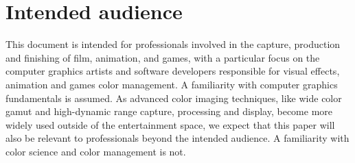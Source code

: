 \section{Intended audience}

This document is intended for professionals involved in the capture, production and finishing of film, animation, and games, with a particular focus on the computer graphics artists and software developers responsible for visual effects, animation and games color management. A familiarity with computer graphics fundamentals is assumed. As advanced color imaging techniques, like wide color gamut and high-dynamic range capture, processing and display, become more widely used outside of the entertainment space, we expect that this paper will also be relevant to professionals beyond the intended audience. A familiarity with color science and color management is not.


